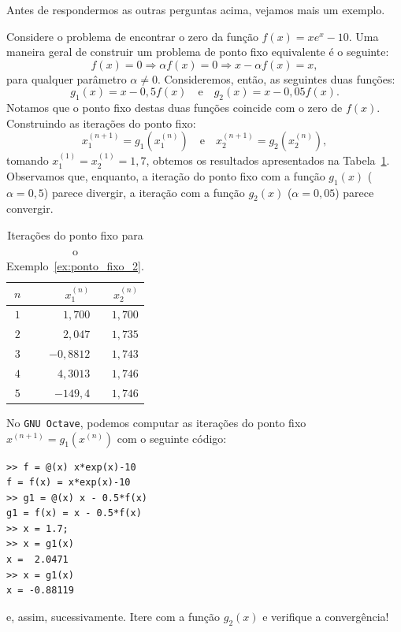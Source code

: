 \begin{ex}

Antes de respondermos as outras perguntas acima, vejamos mais um exemplo.

\begin{ex}\label{ex:ponto_fixo_2}
  Considere o problema de encontrar o zero da função $f(x) = xe^x - 10$. Uma maneira geral de construir um problema de ponto fixo equivalente é o seguinte:
  \begin{equation}
    f(x) = 0 \Rightarrow \alpha f(x) = 0 \Rightarrow x - \alpha f(x) = x,
  \end{equation}
para qualquer parâmetro $\alpha\neq 0$. Consideremos, então, as seguintes duas funções:
\begin{equation}
  g_1(x) = x - 0,5f(x)\quad\text{e}\quad g_2(x) = x - 0,05f(x).
\end{equation}
Notamos que o ponto fixo destas duas funções coincide com o zero de $f(x)$. Construindo as iterações do ponto fixo:
\begin{equation}
  x_1^{(n+1)} = g_1(x_1^{(n)})\quad\text{e}\quad x_2^{(n+1)} = g_2(x_2^{(n)}),
\end{equation}
tomando $x_1^{(1)} = x_2^{(1)} = 1,7$, obtemos os resultados apresentados na Tabela~\ref{tab:ponto_fixo_2}. Observamos que, enquanto, a iteração do ponto fixo com a função $g_1(x)$ ($\alpha = 0,5$) parece divergir, a iteração com a função $g_2(x)$ ($\alpha = 0,05$) parece convergir.

\begin{table}
  \centering
  \caption{Iterações do ponto fixo para o Exemplo~\ref{ex:ponto_fixo_2}.}\label{tab:ponto_fixo_2}
  \begin{tabular}{c|rr}\hline
    $n$ & $x_1^{(n)}$ & $x_2^{(n)}$ \\\hline
    $1$ & $1,700$ & $1,700$\\
    $2$ & $2,047$ & $1,735$\\
    $3$ & $-0,8812$ & $1,743$ \\
    $4$ & $4,3013$ & $1,746$\\
    $5$ & $-149,4$ & $1,746$\\\hline
  \end{tabular}
\end{table}

No \verb+GNU Octave+, podemos computar as iterações do ponto fixo $x^{(n+1)} = g_1(x^{(n)})$ com o seguinte código:
\begin{verbatim}
>> f = @(x) x*exp(x)-10
f = f(x) = x*exp(x)-10
>> g1 = @(x) x - 0.5*f(x)
g1 = f(x) = x - 0.5*f(x)
>> x = 1.7;
>> x = g1(x)
x =  2.0471
>> x = g1(x)
x = -0.88119
\end{verbatim}
e, assim, sucessivamente. Itere com a função $g_2(x)$ e verifique a convergência!


\end{ex}
\end{ex}

